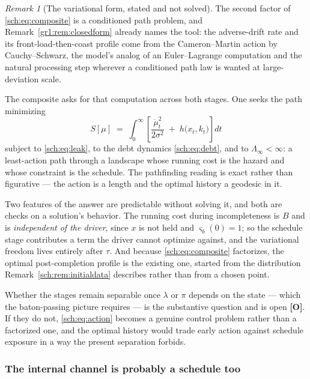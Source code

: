 \documentclass[11pt]{article}
\numberwithin{equation}{section}
\theoremstyle{plain}
\theoremstyle{definition}
\theoremstyle{remark}
\newtheorem{remark}[theorem]{Remark}
\begin{document}
\begin{remark}[The variational form, stated and not solved]
\label{sch:rem:variational}
The second factor of \eqref{sch:eq:composite} is a conditioned path
problem, and Remark~\ref{gr1:rem:closedform} already names the tool: the
adverse-drift rate and its front-load-then-coast profile come from the
Cameron--Martin action by Cauchy--Schwarz, the model's analog of an
Euler--Lagrange computation and the natural processing step wherever a
conditioned path law is wanted at large-deviation scale.

The composite asks for that computation across both stages. One seeks
the path minimizing
\begin{equation}\label{sch:eq:action}
S[\mu]\;=\;\int_0^{\infty}\left[\frac{\dot\mu_t^{2}}{2\sigma^{2}}
\;+\;h\bigl(x_t,k_t\bigr)\right]dt
\end{equation}
subject to \eqref{sch:eq:leak}, to the debt dynamics
\eqref{sch:eq:debt}, and to $\Lambda_\infty<\infty$: a least-action path
through a landscape whose running cost is the hazard and whose
constraint is the schedule. The pathfinding reading is exact rather than
figurative --- the action is a length and the optimal history a geodesic
in it.

Two features of the answer are predictable without solving it, and both
are checks on a solution's behavior. The running cost during
incompleteness is $B$ and is \emph{independent of the driver}, since $x$
is not held and $\varsigma_b(0)=1$; so the schedule stage contributes a
term the driver cannot optimize against, and the variational freedom
lives entirely after $\tau$. And because \eqref{sch:eq:composite}
factorizes, the optimal post-completion profile is the existing one,
started from the distribution Remark~\ref{sch:rem:initialdata}
describes rather than from a chosen point.

Whether the stages remain separable once $\lambda$ or $\pi$ depends on
the state --- which the baton-passing picture requires --- is the
substantive question and is open \textbf{[O]}. If they do not,
\eqref{sch:eq:action} becomes a genuine control problem rather than a
factorized one, and the optimal history would trade early action against
schedule exposure in a way the present separation forbids.
\end{remark}

\subsubsection{The internal channel is probably a schedule too}
\label{sch:subsub:internalschedule}
\end{document}

